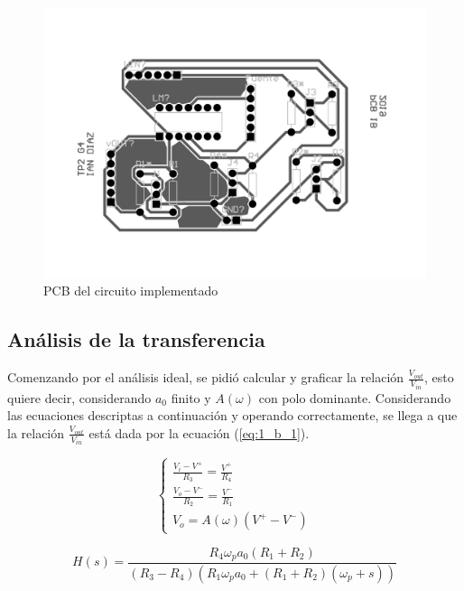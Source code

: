 \begin{figure}[H]
\begin{centering}
\includegraphics[scale=0.3]{../Ex1/ib/Resources1b/PCB}
\par\end{centering}
\caption{PCB del circuito implementado}
\label{1_b_3}

\end{figure}

\subsection{Análisis de la transferencia}

Comenzando por el análisis ideal, se pidió calcular y graficar la
relación $\frac{V_{out}}{V_{in}}$, esto quiere decir, considerando
$a_{0}$ finito y $A(\omega)$ con polo dominante. Considerando las
ecuaciones descriptas a continuación y operando correctamente, se
llega a que la relación $\frac{V_{out}}{V_{in}}$ está dada por la
ecuación (\ref{eq:1_b_1}).

\[
\left\{ \begin{array}{c}
\frac{V_{i}-V^{+}}{R_{3}}=\frac{V^{+}}{R_{4}}\\
\frac{V_{o}-V^{-}}{R_{2}}=\frac{V^{-}}{R_{1}}\\
V_{o}=A(\omega)(V^{+}-V^{-})
\end{array}\right.
\]

\begin{equation}
H(s)=\frac{R_{4}\omega_{p}a_{0}\left(R_{1}+R_{2}\right)}{\left(R_{3}-R_{4}\right)\left(R_{1}\omega_{p}a_{0}+\left(R_{1}+R_{2}\right)\left(\omega_{p}+s\right)\right)}\label{eq:1_b_1}
\end{equation}

